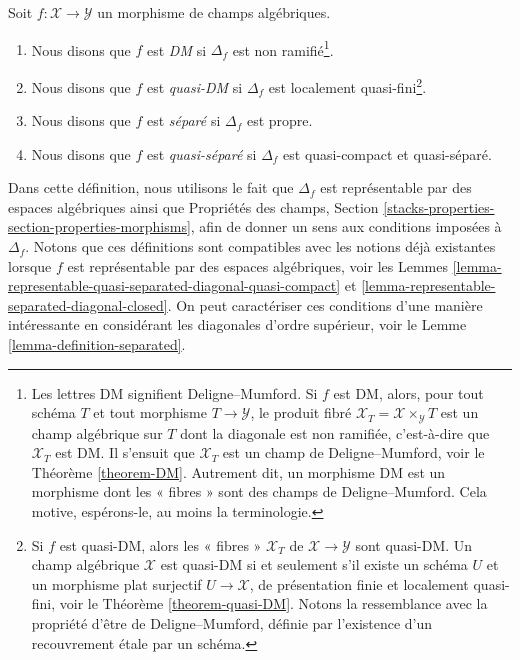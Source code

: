 \begin{definition}
\label{definition-separated}
Soit $f:\mathcal{X}\to\mathcal{Y}$ un morphisme de champs algébriques.
\begin{enumerate}
\item Nous disons que $f$ est {\it DM} si $\Delta_f$ est non
ramifié\footnote{Les lettres DM signifient Deligne--Mumford. Si $f$ est DM,
alors, pour tout schéma $T$ et tout morphisme $T\to\mathcal{Y}$, le produit fibré
$\mathcal{X}_T = \mathcal{X} \times_\mathcal{Y} T$
est un champ algébrique sur $T$ dont la diagonale est non ramifiée,
c'est-à-dire que $\mathcal{X}_T$ est DM. Il s'ensuit que $\mathcal{X}_T$ est
un champ de Deligne--Mumford, voir le Théorème \ref{theorem-DM}. Autrement dit,
un morphisme DM est un morphisme dont les « fibres » sont des champs de
Deligne--Mumford. Cela motive, espérons-le, au moins la terminologie.}.
\item Nous disons que $f$ est {\it quasi-DM} si $\Delta_f$ est localement
quasi-fini\footnote{Si $f$ est quasi-DM, alors les « fibres »
$\mathcal{X}_T$ de $\mathcal{X}\to\mathcal{Y}$ sont quasi-DM. Un champ
algébrique $\mathcal{X}$ est quasi-DM si et seulement s'il existe un schéma
$U$ et un morphisme plat surjectif $U\to\mathcal{X}$, de présentation finie
et localement quasi-fini, voir le Théorème \ref{theorem-quasi-DM}. Notons la
ressemblance avec la propriété d'être de Deligne--Mumford, définie par
l'existence d'un recouvrement étale par un schéma.}.
\item Nous disons que $f$ est {\it séparé} si $\Delta_f$ est propre.
\item Nous disons que $f$ est {\it quasi-séparé} si $\Delta_f$ est
quasi-compact et quasi-séparé.
\end{enumerate}
\end{definition}

\noindent
Dans cette définition, nous utilisons le fait que $\Delta_f$ est représentable
par des espaces algébriques ainsi que Propriétés des champs,
Section \ref{stacks-properties-section-properties-morphisms}, afin de donner
un sens aux conditions imposées à $\Delta_f$. Notons que ces définitions sont
compatibles avec les notions déjà existantes lorsque $f$ est représentable par
des espaces algébriques, voir les Lemmes
\ref{lemma-representable-quasi-separated-diagonal-quasi-compact} et
\ref{lemma-representable-separated-diagonal-closed}. On peut caractériser ces
conditions d'une manière intéressante en considérant les diagonales d'ordre
supérieur, voir le Lemme \ref{lemma-definition-separated}.

